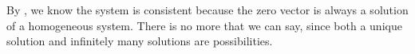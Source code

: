 By , we know the system is consistent because the zero vector is always a solution of a homogeneous system.  There is no more that we can say, since both a unique solution and infinitely many solutions are possibilities.
